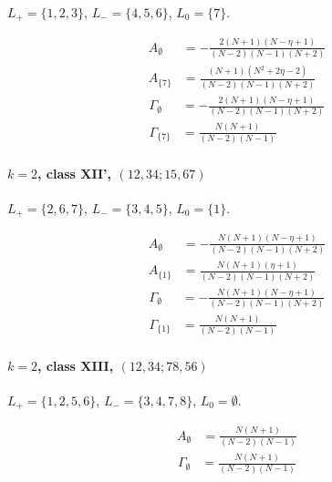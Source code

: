 \documentclass[11pt]{article}
\begin{document}
$L_+=\{1,2,3\}$, $L_-=\{4,5,6\}$, $L_0=\{7\}$.

\begin{align*}
  A_{\emptyset} &= - \frac{2 \left(N + 1\right) \left(N - \eta + 1\right)}{\left(N - 2\right) \left(N - 1\right) \left(N + 2\right)} \\
  A_{\{7\}} &= \frac{\left(N + 1\right) \left(N^{2} + 2 \eta - 2\right)}{\left(N - 2\right) \left(N - 1\right) \left(N + 2\right)} 
\end{align*}
\begin{align*}
  \Gamma_{\emptyset} &= - \frac{2 \left(N + 1\right) \left(N - \eta + 1\right)}{\left(N - 2\right) \left(N - 1\right) \left(N + 2\right)} \\
  \Gamma_{\{7\}} &= \frac{N \left(N + 1\right)}{\left(N - 2\right) \left(N - 1\right)} 
\end{align*}

\paragraph{$k=2$, class XII', $(12,34;15,67)$}

$L_+=\{2,6,7\}$, $L_-=\{3,4,5\}$, $L_0=\{1\}$.

\begin{align*}
  A_{\emptyset} &= - \frac{N \left(N + 1\right) \left(N - \eta + 1\right)}{\left(N - 2\right) \left(N - 1\right) \left(N + 2\right)} \\
  A_{\{1\}} &= \frac{N \left(N + 1\right) \left(\eta + 1\right)}{\left(N - 2\right) \left(N - 1\right) \left(N + 2\right)} 
\end{align*}
\begin{align*}
  \Gamma_{\emptyset} &= - \frac{N \left(N + 1\right) \left(N - \eta + 1\right)}{\left(N - 2\right) \left(N - 1\right) \left(N + 2\right)} \\
  \Gamma_{\{1\}} &= \frac{N \left(N + 1\right)}{\left(N - 2\right) \left(N - 1\right)} 
\end{align*}

\paragraph{$k=2$, class XIII, $(12,34;78,56)$}

$L_+=\{1,2,5,6\}$, $L_-=\{3,4,7,8\}$, $L_0=\emptyset$.

\begin{align*}
  A_{\emptyset} &= \frac{N \left(N + 1\right)}{\left(N - 2\right) \left(N - 1\right)} 
\end{align*}
\begin{align*}
  \Gamma_{\emptyset} &= \frac{N \left(N + 1\right)}{\left(N - 2\right) \left(N - 1\right)} 
\end{align*}
\end{document}
